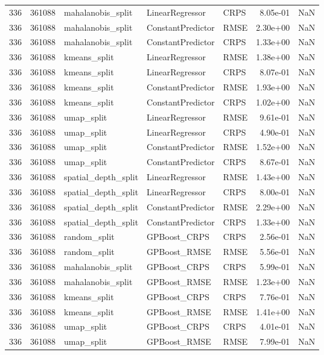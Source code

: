 \begin{tabular}{rrlllrr}
336 & 361088 & mahalanobis\_split & LinearRegressor & CRPS & 8.05e-01 & NaN \\
336 & 361088 & mahalanobis\_split & ConstantPredictor & RMSE & 2.30e+00 & NaN \\
336 & 361088 & mahalanobis\_split & ConstantPredictor & CRPS & 1.33e+00 & NaN \\
336 & 361088 & kmeans\_split & LinearRegressor & RMSE & 1.38e+00 & NaN \\
336 & 361088 & kmeans\_split & LinearRegressor & CRPS & 8.07e-01 & NaN \\
336 & 361088 & kmeans\_split & ConstantPredictor & RMSE & 1.93e+00 & NaN \\
336 & 361088 & kmeans\_split & ConstantPredictor & CRPS & 1.02e+00 & NaN \\
336 & 361088 & umap\_split & LinearRegressor & RMSE & 9.61e-01 & NaN \\
336 & 361088 & umap\_split & LinearRegressor & CRPS & 4.90e-01 & NaN \\
336 & 361088 & umap\_split & ConstantPredictor & RMSE & 1.52e+00 & NaN \\
336 & 361088 & umap\_split & ConstantPredictor & CRPS & 8.67e-01 & NaN \\
336 & 361088 & spatial\_depth\_split & LinearRegressor & RMSE & 1.43e+00 & NaN \\
336 & 361088 & spatial\_depth\_split & LinearRegressor & CRPS & 8.00e-01 & NaN \\
336 & 361088 & spatial\_depth\_split & ConstantPredictor & RMSE & 2.29e+00 & NaN \\
336 & 361088 & spatial\_depth\_split & ConstantPredictor & CRPS & 1.33e+00 & NaN \\
336 & 361088 & random\_split & GPBoost\_CRPS & CRPS & 2.56e-01 & NaN \\
336 & 361088 & random\_split & GPBoost\_RMSE & RMSE & 5.56e-01 & NaN \\
336 & 361088 & mahalanobis\_split & GPBoost\_CRPS & CRPS & 5.99e-01 & NaN \\
336 & 361088 & mahalanobis\_split & GPBoost\_RMSE & RMSE & 1.23e+00 & NaN \\
336 & 361088 & kmeans\_split & GPBoost\_CRPS & CRPS & 7.76e-01 & NaN \\
336 & 361088 & kmeans\_split & GPBoost\_RMSE & RMSE & 1.41e+00 & NaN \\
336 & 361088 & umap\_split & GPBoost\_CRPS & CRPS & 4.01e-01 & NaN \\
336 & 361088 & umap\_split & GPBoost\_RMSE & RMSE & 7.99e-01 & NaN \\

\end{tabular}
